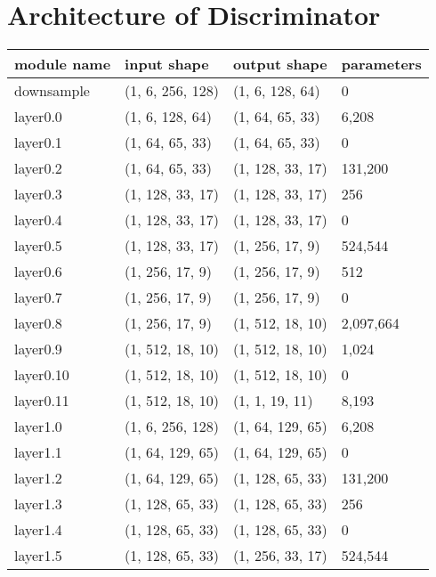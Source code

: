\section{Architecture of Discriminator}
\begin{table}[H]
    \begin{tabular}{llll}
        \toprule
        module name &        input shape &       output shape & parameters \\
        \midrule
        downsample &   (1, 6, 256, 128) &    (1, 6, 128, 64) &          0 \\
        layer0.0 &    (1, 6, 128, 64) &    (1, 64, 65, 33) &      6,208 \\
        layer0.1 &    (1, 64, 65, 33) &    (1, 64, 65, 33) &          0 \\
        layer0.2 &    (1, 64, 65, 33) &   (1, 128, 33, 17) &    131,200 \\
        layer0.3 &   (1, 128, 33, 17) &   (1, 128, 33, 17) &        256 \\
        layer0.4 &   (1, 128, 33, 17) &   (1, 128, 33, 17) &          0 \\
        layer0.5 &   (1, 128, 33, 17) &    (1, 256, 17, 9) &    524,544 \\
        layer0.6 &    (1, 256, 17, 9) &    (1, 256, 17, 9) &        512 \\
        layer0.7 &    (1, 256, 17, 9) &    (1, 256, 17, 9) &          0 \\
        layer0.8 &    (1, 256, 17, 9) &   (1, 512, 18, 10) &  2,097,664 \\
        layer0.9 &   (1, 512, 18, 10) &   (1, 512, 18, 10) &      1,024 \\
        layer0.10 &   (1, 512, 18, 10) &   (1, 512, 18, 10) &          0 \\
        layer0.11 &   (1, 512, 18, 10) &     (1, 1, 19, 11) &      8,193 \\
        layer1.0 &   (1, 6, 256, 128) &   (1, 64, 129, 65) &      6,208 \\
        layer1.1 &   (1, 64, 129, 65) &   (1, 64, 129, 65) &          0 \\
        layer1.2 &   (1, 64, 129, 65) &   (1, 128, 65, 33) &    131,200 \\
        layer1.3 &   (1, 128, 65, 33) &   (1, 128, 65, 33) &        256 \\
        layer1.4 &   (1, 128, 65, 33) &   (1, 128, 65, 33) &          0 \\
        layer1.5 &   (1, 128, 65, 33) &   (1, 256, 33, 17) &    524,544 \\

\end{tabular}
\end{table}
